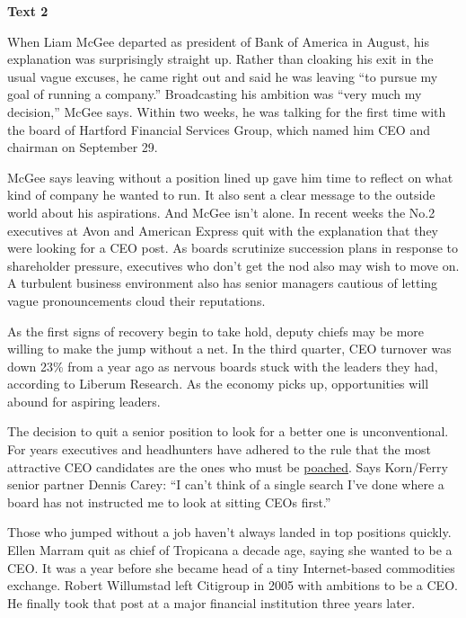 
\begin{center}\textbf{Text 2}\end{center}

\qquad When Liam McGee departed as president of Bank of America in August, his explanation was surprisingly straight up. Rather than cloaking his exit in the usual vague excuses, he came right out and said he was leaving ``to pursue my goal of running a company.'' Broadcasting his ambition was ``very much my decision,'' McGee says. Within two weeks, he was talking for the first time with the board of Hartford Financial Services Group, which named him CEO and chairman on September 29.

\qquad McGee says leaving without a position lined up gave him time to reflect on what kind of company he wanted to run. It also sent a clear message to the outside world about his aspirations. And McGee isn't alone. In recent weeks the No.2 executives at Avon and American Express quit with the explanation that they were looking for a CEO post. As boards scrutinize succession plans in response to shareholder pressure, executives who don't get the nod also may wish to move on. A turbulent business environment also has senior managers cautious of letting vague pronouncements cloud their reputations. 

\qquad As the first signs of recovery begin to take hold, deputy chiefs may be more willing to make the jump without a net. In the third quarter, CEO turnover was down 23\% from a year ago as nervous boards stuck with the leaders they had, according to Liberum Research. As the economy picks up, opportunities will abound for aspiring leaders.

\qquad The decision to quit a senior position to look for a better one is unconventional. For years executives and headhunters have adhered to the rule that the most attractive CEO candidates are the ones who must be \ul{poached}. Says Korn/Ferry senior partner Dennis Carey: ``I can't think of a single search I've done where a board has not instructed me to look at sitting CEOs first.''

\qquad Those who jumped without a job haven't always landed in top positions quickly. Ellen Marram quit as chief of Tropicana a decade age, saying she wanted to be a CEO. It was a year before she became head of a tiny Internet-based commodities exchange. Robert Willumstad left Citigroup in 2005 with ambitions to be a CEO. He finally took that post at a major financial institution three years later.

